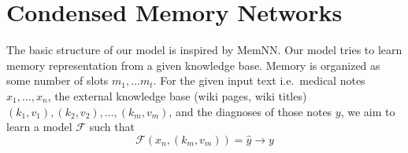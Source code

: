 \section{Condensed Memory Networks}
The basic structure of our model is inspired by MemNN\@. Our model tries to learn memory representation from a given knowledge base. Memory is organized as some number of slots $m_1, \ldots m_t$. For the given input text i.e.\ medical notes $x_1, \ldots, x_n$, the external knowledge base (wiki pages, wiki titles) $(k_1, v_1), (k_2, v_2), \ldots , (k_m, v_m)$, and the diagnoses of those notes $y$, we aim to learn a model $\mathcal{F}$ such that
    \begin{equation}
        \mathcal{F}(x_n, (k_m, v_m)) = \hat{y} \rightarrow y
    \end{equation}

